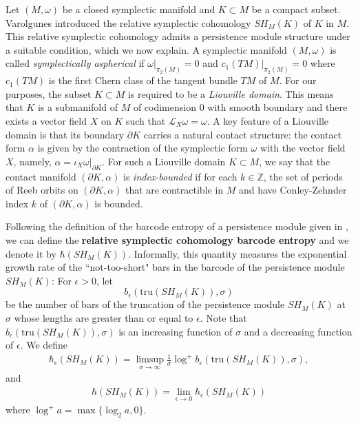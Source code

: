 \documentclass[12pt]{amsart}
\theoremstyle{definition}
\newcommand{\ZZ}{{\mathbb Z}}
\begin{document}
\vspace{0.2cm}

Let $(M,\omega)$ be a closed symplectic manifold and $K\subset M$ be a compact subset. Varolgunes \cite{v} introduced the relative symplectic cohomology $SH_M(K)$ of $K$ in $M$. This relative symplectic cohomology admits a persistence module structure under a suitable condition, which we now explain. A symplectic manifold $(M,\omega)$ is called \textit{symplectically aspherical} if $\omega|_{\pi_2(M)}=0$ and $c_1(TM)|_{\pi_2(M)}=0$ where $c_1(TM)$ is the first Chern class of the tangent bundle $TM$ of $M$. For our purposes, the subset $K \subset M$ is required to be a \textit{Liouville domain}. This means that $K$ is a submanifold of $M$ of codimension 0 with smooth boundary and there exists a vector field $X$ on $K$ such that $\mathcal{L}_X \omega = \omega$. A key feature of a Liouville domain is that its boundary $\partial K$ carries a natural contact structure: the contact form $\alpha$ is given by the contraction of the symplectic form $\omega$ with the vector field $X$, namely, $\alpha = \iota_X\omega|_{\partial K}$. For such a Liouville domain $K \subset M$, we say that the contact manifold $(\partial K, \alpha)$ is \textit{index-bounded} if for each $k\in\ZZ$, the set of periods of Reeb orbits on $(\partial K, \alpha)$ that are contractible in $M$ and have Conley-Zehnder index $k$ of $(\partial K, \alpha)$ is bounded. 

\vspace{0.2cm}

Following the definition of the barcode entropy of a persistence module given in \cite{cgg}, we can define the \textbf{relative symplectic cohomology barcode entropy} and we denote it by $\hbar(SH_M(K))$. Informally, this quantity measures the exponential growth rate of the ``not-too-short" bars in the barcode of the persistence module $SH_M(K)$: For $\epsilon>0$, let $$b_\epsilon(\textrm{tru}(SH_M(K)),\sigma)$$ be the number of bars of the truncation of the persistence module $SH_M(K)$ at $\sigma$ whose lengths are greater than or equal to $\epsilon$. Note that $b_\epsilon(\textrm{tru}(SH_M(K)),\sigma)$ is an increasing function of $\sigma$ and a decreasing function of $\epsilon$. We define
\begin{align*}
    \hbar_\epsilon(SH_M(K)) = \limsup_{\sigma \to \infty} \frac{1}{\sigma}\log^+b_\epsilon(\textrm{tru}(SH_M(K)),\sigma),
\end{align*}
and
\begin{align*}
    \hbar(SH_M(K)) = \lim_{\epsilon \to 0} \hbar_\epsilon(SH_M(K))
\end{align*}
where $\log^+a = \max\{\log_2 a, 0\}$.
\vspace{0.2cm}
\end{document}
